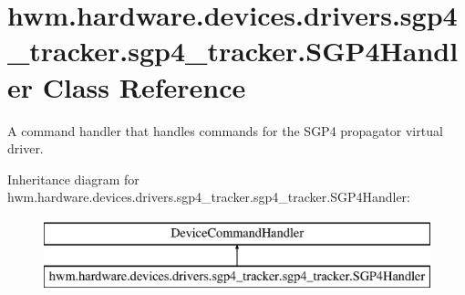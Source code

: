 \hypertarget{classhwm_1_1hardware_1_1devices_1_1drivers_1_1sgp4__tracker_1_1sgp4__tracker_1_1_s_g_p4_handler}{\section{hwm.\-hardware.\-devices.\-drivers.\-sgp4\-\_\-tracker.\-sgp4\-\_\-tracker.\-S\-G\-P4\-Handler Class Reference}
\label{classhwm_1_1hardware_1_1devices_1_1drivers_1_1sgp4__tracker_1_1sgp4__tracker_1_1_s_g_p4_handler}
}


A command handler that handles commands for the S\-G\-P4 propagator virtual driver.  


Inheritance diagram for hwm.\-hardware.\-devices.\-drivers.\-sgp4\-\_\-tracker.\-sgp4\-\_\-tracker.\-S\-G\-P4\-Handler\-:\begin{figure}[H]
\begin{center}
\leavevmode
\includegraphics[height=2.000000cm]{classhwm_1_1hardware_1_1devices_1_1drivers_1_1sgp4__tracker_1_1sgp4__tracker_1_1_s_g_p4_handler}
\end{center}
\end{figure}
